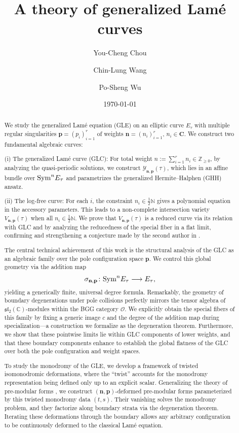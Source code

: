 \documentclass[11pt]{amsart}
\title{A theory of generalized Lam\'e curves}
\author{You-Cheng Chou}
\author{Chin-Lung Wang}
\author{Po-Sheng Wu}
\date{\today}
\theoremstyle{remark}
\numberwithin{equation}{section}
\newcommand{\Sym}{{\rm Sym}}
\begin{document}
\begin{abstract}
We study the generalized Lam\'e equation (GLE) on an elliptic curve $E_\tau$ with multiple regular singularities $\mathbf{p} = (p_i)_{i = 1}^r$ of weights $\mathbf{n} = (n_i)_{i = 1}^r$, $n_i \in \mathbf{C}$. We construct two fundamental algebraic curves:


(i) The generalized Lam\'e curve (GLC): For total weight $n:=\sum\nolimits_{i=1}^r n_i\in\mathbb Z_{\geq 0}$, by analyzing the quasi-periodic solutions, we construct $\mathcal{Y}_{\mathbf{n}, \mathbf{p}}(\tau)$, which lies in an affine bundle over $\Sym^n E_\tau$ and parametrizes the generalized Hermite--Halphen (GHH) ansatz. 

(ii) The log-free curve: For each $i$, the constraint $n_i\in\tfrac{1}{2}\mathbb{N}$ gives a polynomial equation in the accessory parameters. This leads to a non-complete intersection variety $V_{\mathbf{n}, \mathbf{p}}(\tau)$ when all $n_i\in\tfrac{1}{2} \mathbb{N}$. We prove that $V_{\mathbf{n},\mathbf{p}}(\tau)$ is a reduced curve via its relation with GLC and by analyzing the reducedness of the special fiber in a flat limit, confirming and strengthening a conjecture made by the second author in \cite{Wang_2020}.

The central technical achievement of this work is the structural analysis of the GLC as an algebraic family over the pole configuration space $\mathbf{p}$. We control this global geometry via the addition map
\[
\sigma_{\mathbf{n},\mathbf{p}} \colon \Sym^n E_\tau \longrightarrow E_\tau,
\]
yielding a generically finite, universal degree formula. Remarkably, the geometry of boundary degenerations under pole collisions perfectly mirrors the tensor algebra of $\mathfrak{sl}_2(\mathbb{C})$-modules within the BGG category $\mathcal{O}$. We explicitly obtain the special fibers of this family by fixing a generic image $c$ and the degree of the addition map during specialization—a construction we formalize as the degeneration theorem. Furthermore, we show that these pointwise limits lie within GLC components of lower weights, and that these boundary components enhance to establish the global flatness of the GLC over both the pole configuration and weight spaces.

To study the monodromy of the GLE, we develop a framework of twisted isomonodromic deformations, where the ``twist'' accounts for the monodromy representation being defined only up to an explicit scalar. Generalizing the theory of pre-modular forms \cite{Lin_Wang_2017}, we construct $(\mathbf{n}, \mathbf{p})$-deformed pre-modular forms parameterized by this twisted monodromy data $(t,s)$. Their vanishing solves the monodromy problem, and they factorize along boundary strata via the degeneration theorem. Iterating these deformations through the boundary allows any arbitrary configuration to be continuously deformed to the classical Lam\'e equation.


\end{abstract}
\end{document}
